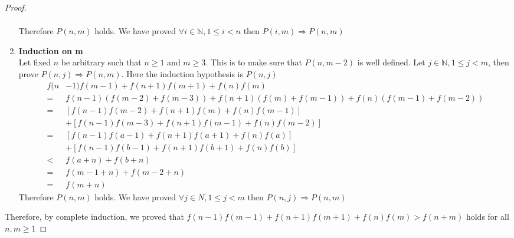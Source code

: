 \documentclass[11pt]{article}
\theoremstyle{plain}%
\theoremstyle{definition}
\theoremstyle{remark}
\newcommand{\N}{\mathbb{N}}
\begin{document}
\begin{proof}
\begin{enumerate}
\begin{align*}
      \end{align*}
      Therefore $P(n, m)$ holds. We have proved $\forall i\in \N, 1\leq i < n$ then $P(i, m) \Rightarrow P(n, m)$
      \item \textbf{Induction on m} \\
      Let fixed $n$ be arbitrary such that $n\geq 1$ and $m\geq 3$. This is to make sure that $P(n, m-2)$ is well defined. Let $j\in \N, 1\leq j < m$, then prove $P(n, j) \Rightarrow P(n, m)$. Here the induction hypothesis is $P(n,j)$
      \begin{align*}
        f(n&-1)f(m-1)+f(n+1)f(m+1)+f(n)f(m) \\
        =& f(n-1)(f(m-2) + f(m-3)) + f(n+1)(f(m) + f(m-1)) + f(n)(f(m-1) + f(m-2)) \tag{ by recurrence relationship}\\
        =& [f(n-1)f(m-2) + f(n+1)f(m) + f(n)f(m-1)] \\
        &+ [f(n-1)f(m-3) + f(n+1)f(m-1) + f(n)f(m-2)] \tag{ arithmetics}\\
        =& [f(n-1)f(a-1) + f(n+1)f(a+1) + f(n)f(a)] \\
        &+ [f(n-1)f(b-1) + f(n+1)f(b+1) + f(n)f(b)] \tag{let $a=m-1$ amd $b=m-2$, them $1\leq a < m$ and $1\leq b < m$ as $m\geq 3$} \\
        <& f(a+n) + f(b+n) \tag{ by Induction hypothesis, specifically, $P(n, a)$ and $P(n, b)$ holds} \\
        =& f(m-1+n) + f(m-2+n) \tag{$a=m-1$ and $b=m-2$}\\
        =& f(m+n) \tag{by recurrence relationship}
      \end{align*}
      Therefore $P(n, m)$ holds. We have proved $\forall j\in N, 1\leq j < m$ then $P(n, j) \Rightarrow P(n, m)$
    \end{enumerate}
    Therefore, by complete induction, we proved that $f(n-1)f(m-1)+f(n+1)f(m+1)+f(n)f(m) > f(n+m)$ holds for all $n,m \geq 1$

  \end{proof}
\end{document}
